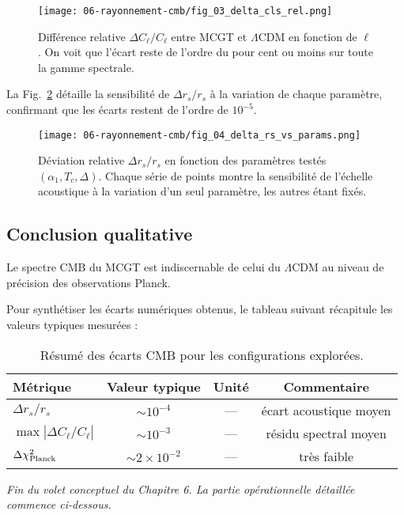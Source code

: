 \begin{figure}[htbp]
  \centering
  \texttt{[image: 06-rayonnement-cmb/fig\_03\_delta\_cls\_rel.png]}
  \caption{Différence relative \(\Delta C_{\ell}/C_{\ell}\) entre MCGT et \(\Lambda\)CDM en fonction de \(\ell\). On voit que l’écart reste de l’ordre du pour cent ou moins sur toute la gamme spectrale.}
  \label{fig:delta_cls_rel}
\end{figure}

\noindent La Fig.~\ref{fig:delta_rs_vs_params} détaille la sensibilité de \(\Delta r_{s}/r_{s}\) à la variation de chaque paramètre, confirmant que les écarts restent de l’ordre de \(10^{-5}\).

\begin{figure}[htbp]
  \centering
  \texttt{[image: 06-rayonnement-cmb/fig\_04\_delta\_rs\_vs\_params.png]}
  \caption{Déviation relative \(\Delta r_{s}/r_{s}\) en fonction des paramètres testés \((\alpha_{1},T_{c},\Delta)\). Chaque série de points montre la sensibilité de l’échelle acoustique à la variation d’un seul paramètre, les autres étant fixés.}
  \label{fig:delta_rs_vs_params}
\end{figure}

\subsection{Conclusion qualitative}
Le spectre CMB du MCGT est indiscernable de celui du \(\Lambda\)CDM au niveau de précision des observations Planck.

\noindent Pour synthétiser les écarts numériques obtenus, le tableau suivant récapitule les valeurs typiques mesurées :

\begin{table}[htbp]
\centering
\begin{tabular}{l c c c}
  \toprule
  Métrique                           & Valeur typique    & Unité & Commentaire               \\
  \midrule
  \(\Delta r_s/r_s\)                 & \(\sim10^{-4}\)   & —     & écart acoustique moyen    \\
  \(\max|\Delta C_\ell / C_\ell|\)   & \(\sim10^{-3}\)   & —     & résidu spectral moyen            \\
  \(\Delta\chi^2_{\rm Planck}\)      & \(\sim2\times10^{-2}\) & —     & très faible              \\
  \bottomrule
\end{tabular}
\caption{Résumé des écarts CMB pour les configurations explorées.}
\end{table}

\noindent\emph{Fin du volet conceptuel du Chapitre 6. La partie opérationnelle détaillée commence ci-dessous.}
